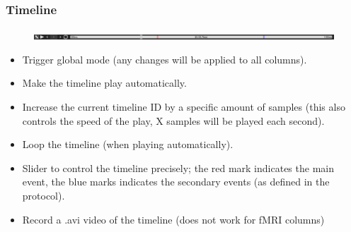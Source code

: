 \documentclass[a4paper]{article}
\begin{document}
\subsubsection{Timeline}
\begin{figure}[H]
\begin{center}
\includegraphics[scale=0.3]{Timeline.png}
\end{center}
\end{figure}
\begin{itemize}
\item Trigger global mode (any changes will be applied to all columns).
\item Make the timeline play automatically.
\item Increase the current timeline ID by a specific amount of samples (this also controls the speed of the play, X samples will be played each second).
\item Loop the timeline (when playing automatically).
\item Slider to control the timeline precisely; the red mark indicates the main event, the blue marks indicates the secondary events (as defined in the protocol).
\item Record a .avi video of the timeline (does not work for fMRI columns)
\end{itemize}
\end{document}
